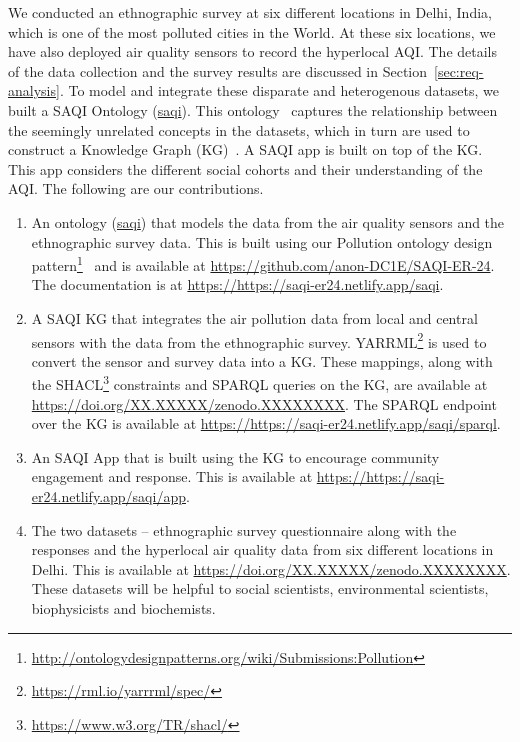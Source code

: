 We conducted an ethnographic survey at six different locations in Delhi, India, which is one of the most polluted cities in the World. At these six locations, we have also deployed air quality sensors to record the hyperlocal AQI. The details of the data collection and the survey results are discussed in Section~\ref{sec:req-analysis}. To model and integrate these disparate and heterogenous datasets, we built a SAQI Ontology (\href{https://saqi-er24.netlify.app/saqi}{saqi}). This ontology~\cite{Ont-NG-2009} captures the relationship between the seemingly unrelated concepts in the datasets, which in turn are used to construct a Knowledge Graph (KG)~\cite{KG-ACMSurvey2021}. A SAQI app is built on top of the KG. This app considers the different social cohorts and their understanding of the AQI. The following are our contributions.
\begin{enumerate}
    \item An ontology (\href{https://saqi-er24.netlify.app/saqi}{saqi}) that models the data from the air quality sensors and the ethnographic survey data. This is built using our Pollution ontology design pattern\footnote{\url{http://ontologydesignpatterns.org/wiki/Submissions:Pollution}}~\cite{Saad-PollutionODP-WOP2021} and is available at \url{https://github.com/anon-DC1E/SAQI-ER-24}. The documentation is at \url{https://https://saqi-er24.netlify.app/saqi}.
    \item A SAQI KG that integrates the air pollution data from local and central sensors with the data from the ethnographic survey. YARRML\footnote{\url{https://rml.io/yarrrml/spec/}} is used to convert the sensor and survey data into a KG. These mappings, along with the SHACL\footnote{\url{https://www.w3.org/TR/shacl/}} constraints and SPARQL queries on the KG, are available at \url{https://doi.org/XX.XXXXX/zenodo.XXXXXXXX}. The SPARQL endpoint over the KG is available at \url{https://https://saqi-er24.netlify.app/saqi/sparql}.
    \item An SAQI App that is built using the KG to encourage community engagement and response. This is available at \url{https://https://saqi-er24.netlify.app/saqi/app}.
    \item The two datasets -- ethnographic survey questionnaire along with the responses and the hyperlocal air quality data from six different locations in Delhi. This is available at \url{https://doi.org/XX.XXXXX/zenodo.XXXXXXXX}. These datasets will be helpful to social scientists, environmental scientists, biophysicists and biochemists.  
\end{enumerate}

